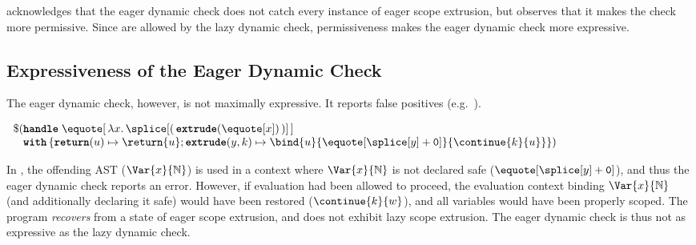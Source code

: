 \citet{kiselyov-14} acknowledges that the eager dynamic check does not catch every instance of eager scope extrusion, but observes that it makes the check more permissive. Since  are allowed by the lazy dynamic check, permissiveness makes the eager dynamic check more expressive. 

\subsection{Expressiveness of the Eager Dynamic Check}\label{subsection:eager-dynamic-expressiveness}
The eager dynamic check, however, is not maximally expressive. It reports false positives (e.g.\ ).

\begin{code} 
 \begin{source}
  $\begin{array}{l}
      \$ (\textbf{\texttt{handle}} \; \equote[\, {\lambda x. \, {\splice[(\, {{\textbf{\texttt{extrude}}(\equote[x])}} \, )]}}\,] \\
      \;\;\,\,\textbf{\texttt{with}} \, \{ \textbf{\texttt{return}}(u) \mapsto {\return{u}}; \textbf{\texttt{extrude}}(y, k) \mapsto {\bind{u}{\equote[{\splice[y]} + \texttt{0}]}{\continue{k}{u}}}\})
    \end{array}$
 \end{source}
 \label{listing:eager-scope-extrusion-looks-unsafe}
\end{code}

In , the offending AST ($\Var{x}{\mathbb{N}}$) is used in a context where $\Var{x}{\mathbb{N}}$ is not declared safe ($\equote[{\splice[y]} + \texttt{0}]$), and thus the eager dynamic check reports an error. However, if evaluation had been allowed to proceed, the evaluation context binding $\Var{x}{\mathbb{N}}$ (and additionally declaring it safe) would have been restored ($\continue{k}{w}$), and all variables would have been properly scoped. The program \textit{recovers} from a state of eager scope extrusion, and does not exhibit lazy scope extrusion. The eager dynamic check is thus not as expressive as the lazy dynamic check.

